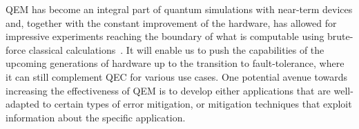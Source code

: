 QEM has become an integral part of quantum simulations with near-term devices and, together with the constant improvement of the hardware, has allowed for impressive experiments reaching the boundary of what is computable using brute-force classical calculations~\cite{kim2023evidence}.
It will enable us to push the capabilities of the upcoming generations of hardware up to the transition to fault-tolerance, where it can still complement QEC for various use cases.
One potential avenue towards increasing the effectiveness of QEM is to develop either applications that are well-adapted to certain types of error mitigation, or mitigation techniques that exploit information about the specific application.
